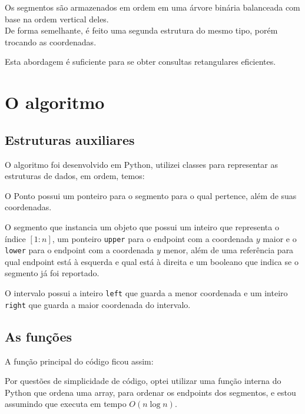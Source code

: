 \documentclass{article}
\theoremstyle{definition}
\begin{document}
Os segmentos são armazenados em ordem em uma árvore binária balanceada 
com base na ordem vertical deles.\\
De forma semelhante, é feito uma segunda estrutura do mesmo tipo, porém 
trocando as coordenadas.

\hspace*{15pt} Esta abordagem é suficiente para se obter consultas retangulares eficientes.

\section{O algoritmo}
\subsection{Estruturas auxiliares}
\hspace*{15pt} O algoritmo foi desenvolvido em Python, utilizei classes 
para representar as estruturas de dados, em ordem, temos:

\hspace*{15pt}O Ponto possui um ponteiro para o segmento para o qual 
pertence, além de suas coordenadas. 


\hspace*{15pt}O segmento que instancia um objeto que possui um inteiro
que representa o índice $[1:n]$, um ponteiro \texttt{upper}
para o endpoint com a coordenada $y$ maior e o \texttt{lower} para
o endpoint com a coordenada $y$ menor, além de uma referência para
qual endpoint está à esquerda e qual está à direita e um booleano
que indica se o segmento já foi reportado.


\hspace*{15pt} O intervalo possui a inteiro \texttt{left} que guarda
a menor coordenada e um inteiro \texttt{right} que guarda a maior
coordenada do intervalo.



\subsection{As funções}
A função principal do código ficou assim:

\hspace*{15pt} Por questões de simplicidade de código, optei utilizar uma 
função interna do Python que ordena uma array, para ordenar os endpoints 
dos segmentos, e estou assumindo que executa em tempo $O(n\log n)$.
\end{document}
